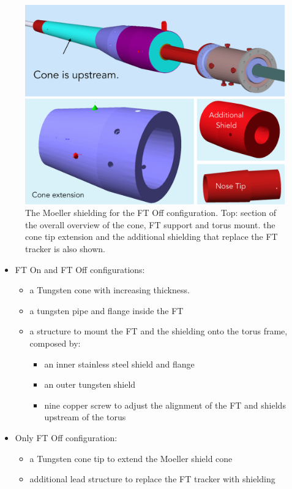 \begin{figure}
	\centering
	\includegraphics[width=0.98\columnwidth,keepaspectratio]{img/moellerShieldingFTOff.png}
   \caption{The Moeller shielding for the FT Off configuration. Top: section of the overall overview of the cone, FT support and torus mount.
            the cone tip extension and the additional shielding that replace the FT tracker is also shown.}
	\label{fig:moellerShieldingFTOff}
\end{figure}



\begin{itemize}
	\item FT On and FT Off configurations:
	\begin{itemize}
		\item a Tungsten cone with increasing thickness.
		\item a tungsten pipe and flange inside the FT
		\item a structure to mount the FT and the shielding onto the torus frame, composed by:
		\begin{itemize}
			\item an inner stainless steel shield and flange
			\item an outer tungsten shield
			\item nine copper screw to adjust the alignment of the FT and shields upstream of the torus
		\end{itemize}
	\end{itemize}
	\item Only FT Off configuration:
	\begin{itemize}
	\item a Tungsten cone tip to extend the Moeller shield cone
	\item additional lead structure to replace the FT tracker with shielding
	\end{itemize}

\end{itemize}




